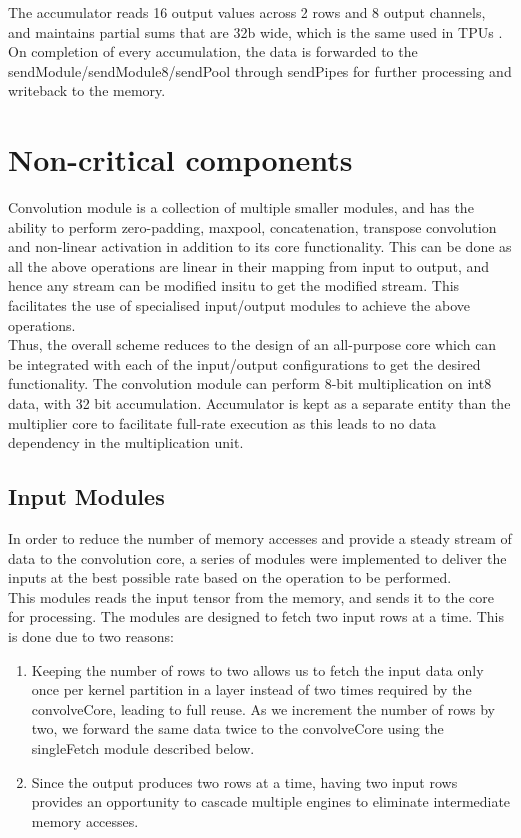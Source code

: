 \documentclass[a4paper,12pt, final]{report}
\begin{document}
The accumulator reads 16 output values across 2 rows and 8 output channels, and maintains partial sums that are 32b wide, which is the same used in TPUs \cite{TPU}. On completion of every accumulation, the data is forwarded to the sendModule/sendModule8/sendPool through sendPipes for further processing and writeback to the memory.


\section{Non-critical components}

Convolution module is a collection of multiple smaller modules, and has the ability to perform zero-padding, maxpool, concatenation, transpose convolution and non-linear activation in addition to its core functionality. This can be done as all the above operations are linear in their mapping from input to output, and hence any stream can be modified insitu to get the modified stream. This facilitates the use of specialised input/output modules to achieve the above operations.
\\

Thus, the overall scheme reduces to the design of an all-purpose core which can be integrated with each of the input/output configurations to get the desired functionality. The convolution module can perform 8-bit multiplication on int8 data, with 32 bit accumulation. Accumulator is kept as a separate entity than the multiplier core to facilitate full-rate execution as this leads to no data dependency in the multiplication unit.
\\

\subsection{Input Modules}

In order to reduce the number of memory accesses and provide a steady stream of data to the convolution core, a series of modules were implemented to deliver the inputs at the best possible rate based on the operation to be performed.
\\

This modules reads the input tensor from the memory, and sends it to the core for processing. The modules are designed to fetch two input rows at a time. This is done due to two reasons:
\begin{enumerate}
\item Keeping the number of rows to two allows us to fetch the input data only once per kernel partition in a layer instead of two times required by the convolveCore, leading to full reuse. As we increment the number of rows by two, we forward the same data twice to the convolveCore using the singleFetch module described below.
\item Since the output produces two rows at a time, having two input rows provides an opportunity to cascade multiple engines to eliminate intermediate memory accesses.
\end{enumerate}
\end{document}
